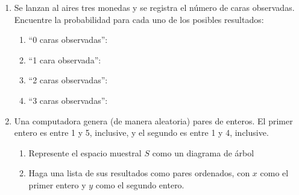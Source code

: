 \documentclass[letterpaper,fleqn]{article}
\begin{document}
\begin{enumerate}
\item Se lanzan al aires tres monedas y se registra el número de caras observadas. Encuentre la probabilidad para cada uno de los posibles resultados:
\begin{enumerate}
 \item ``0 caras observadas'': 
 \item ``1 cara observada'': 
 \item ``2 caras observadas'': 
 \item ``3 caras observadas'': 
\end{enumerate}
\item Una computadora genera (de manera aleatoria) pares de enteros. El primer entero es entre 1 y 5, inclusive, y el segundo es entre 1 y 4, inclusive.
\begin{enumerate}
 \item Represente el espacio muestral $S$ como un diagrama de árbol \noanswer
 \item Haga una lista de sus resultados como pares ordenados, con $x$ como el primer entero y $y$ como el segundo entero.\noanswer
\end{enumerate}

\end{enumerate}
\end{document}
